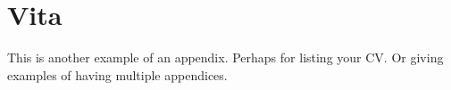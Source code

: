 \chapter{Vita}

This is another example of an appendix. Perhaps for listing your CV. Or giving
examples of having multiple appendices.
